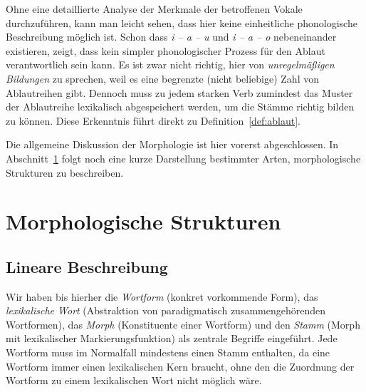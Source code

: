 Ohne eine detaillierte Analyse der Merkmale der betroffenen Vokale durchzuführen, kann man leicht sehen, dass hier keine einheitliche phonologische Beschreibung möglich ist.
Schon dass \textit{i -- a -- u} und \textit{i -- a -- o} nebeneinander existieren, zeigt, dass kein simpler phonologischer Prozess für den Ablaut verantwortlich sein kann.
Es ist zwar nicht richtig, hier von \textit{unregelmäßigen Bildungen} zu sprechen, weil es eine begrenzte (nicht beliebige) Zahl von Ablautreihen gibt.
Dennoch muss zu jedem starken Verb zumindest das Muster der Ablautreihe lexikalisch abgespeichert werden, um die Stämme richtig bilden zu können.
Diese Erkenntnis führt direkt zu Definition~\ref{def:ablaut}.


Die allgemeine Diskussion der Morphologie ist hier vorerst abgeschlossen.
In Abschnitt~\ref{sec:morphstruktur} folgt noch eine kurze Darstellung bestimmter Arten, morphologische Strukturen zu beschreiben.





\section{Morphologische Strukturen}

\label{sec:morphstruktur}

\subsection{Lineare Beschreibung}

\label{sec:morphlinterm}

Wir haben bis hierher die \textit{Wortform} (konkret vorkommende Form), das \textit{lexikalische Wort} (Abstraktion von paradigmatisch zusammengehörenden Wortformen), das \textit{Morph} (Konstituente einer Wortform) und den \textit{Stamm} (Morph mit lexikalischer Markierungsfunktion) als zentrale Begriffe eingeführt.
Jede Wortform muss im Normalfall mindestens einen Stamm enthalten, da eine Wortform immer einen lexikalischen Kern braucht, ohne den die Zuordnung der Wortform zu einem lexikalischen Wort nicht möglich wäre.

